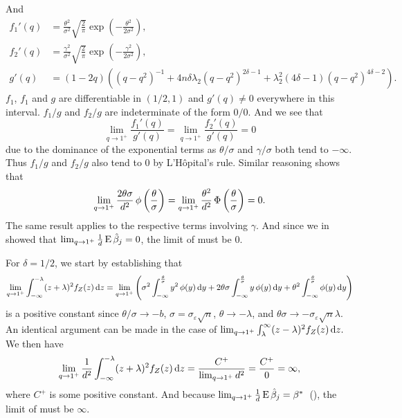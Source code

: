 And
\begin{align*}
  f_1'(q) & = \frac{\theta^2}{\sigma^2}\sqrt{\frac{2}{\pi}}\exp\left(-\frac{\theta^2}{2\sigma^2}\right),                                    \\
  f_2'(q) & = \frac{\gamma^2}{\sigma^2}\sqrt{\frac{2}{\pi}}\exp\left(-\frac{\gamma^2}{2\sigma^2}\right),                                    \\
  g'(q)   & = (1-2q)\left((q-q^2)^{-1} + 4n\delta \lambda_2 (q-q^2)^{2\delta - 1} + \lambda_2^2 (4 \delta - 1)(q-q^2)^{4\delta - 2}\right).
\end{align*}
\(f_1\), \(f_1\) and \(g\) are differentiable in \((1/2, 1)\) and \(g'(q) \neq 0\) everywhere in this interval. \(f_1/g\) and \(f_2/g\) are indeterminate of the form \(0/0\). And we see that
\[
  \lim_{q \rightarrow 1^+} \frac{f_1'(q)}{g'(q)} = \lim_{q \rightarrow 1^+} \frac{f_2'(q)}{g'(q)} = 0
\]
due to the dominance of the exponential terms as \(\theta/\sigma\) and \(\gamma/\sigma\)
both tend to \(-\infty\). Thus \(f_1/g\) and \(f_2/g\) also tend to 0 by L'Hôpital's rule.
Similar reasoning shows that
\[
  \lim_{q \rightarrow 1^+} \frac{2\theta \sigma}{d^2} \operatorname{\phi} \left(\frac{\theta}{\sigma}\right) = \lim_{q \rightarrow 1^+} \frac{\theta^2}{d^2} \operatorname{\Phi} \left(\frac{\theta}{\sigma}\right) = 0.
\]
The same result applies to the respective terms involving \(\gamma\). And since we in
 showed that \(\lim_{q\rightarrow 1^+} \frac{1}{d} \operatorname{E}
\hat{\beta}_j = 0\), the limit of  must be 0.

For \(\delta = 1/2\), we start by establishing that
\begin{equation}
  \label{eq:var-deltahalf-integral}
  \lim_{q \rightarrow 1^+} \int_{-\infty}^{-\lambda}(z+ \lambda)^2 f_Z(z) \mathop{}\!\mathrm{d} z = \lim_{q \rightarrow 1^+} \left(\sigma^2 \int_{-\infty}^\frac{\theta}{\sigma} y^2 \operatorname{\phi}(y) \mathop{}\!\mathrm{d} y + 2 \theta \sigma \int_{-\infty}^\frac{\theta}{\sigma} y \operatorname{\phi}(y) \mathop{}\!\mathrm{d} y + \theta^2 \int_{-\infty}^\frac{\theta}{\sigma} \operatorname{\phi}(y) \mathop{}\!\mathrm{d} y\right)
\end{equation}
is a positive constant since \(\theta/\sigma \rightarrow -b\), \(\sigma =
\sigma_\varepsilon \sqrt{n}\), \(\theta \rightarrow - \lambda\), and \(\theta\sigma
\rightarrow - \sigma_\varepsilon \sqrt{n}\lambda\). An identical argument can be made in
the case of \(\lim_{q \rightarrow 1^+} \int_{\lambda}^{\infty}(z - \lambda)^2 f_Z(z) \mathop{}\!\mathrm{d}
z.\) We then have
\[
  \lim_{q \rightarrow 1^+} \frac{1}{d^2} \int_{-\infty}^{-\lambda}(z+ \lambda)^2 f_Z(z) \mathop{}\!\mathrm{d} z = \frac{C^+}{\lim_{q\rightarrow 1^+} d^2} = \frac{C^+}{0} = \infty,
\]
where \(C^+\) is some positive constant. And because \(\lim_{q\rightarrow 1^+} \frac{1}{d}
\operatorname{E} \hat{\beta}_j = \beta^*\)~(), the limit of
 must be \(\infty\).


